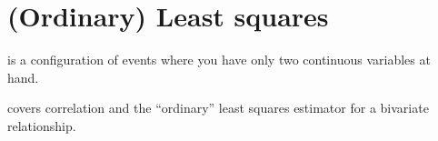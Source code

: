 \chapter[Least squares]{(Ordinary) Least squares}
\label{ch:ols}

 is a configuration of events where you have only two continuous variables at hand.%

	 covers correlation and the ``ordinary'' least squares estimator for a bivariate relationship.

% 
% 
% 
% 
% 
% 
% 
% 
